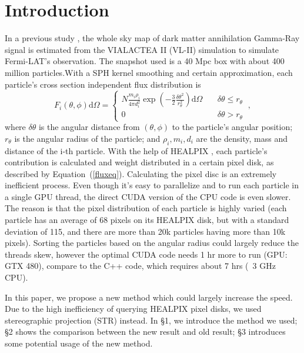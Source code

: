 \section*{Introduction}
In a previous study \citet{Kuhlen:2008kr}, the whole sky map of dark matter annihilation Gamma-Ray signal is estimated from the VIALACTEA II (VL-II) simulation to simulate Fermi-LAT's observation. The snapshot used is a 40 Mpc box with about 400 million particles.With a SPH kernel smoothing and certain approximation, each particle's cross section independent flux distribution is
\begin{equation}\label{fluxeq}
	F_i(\theta,\phi)\mathrm{d}\Omega = 
	\left\{\begin{aligned}
		N\frac{m_i\rho_i}{4\pi d_i^2} \exp\left(-\frac{3}2\frac{\delta\theta^2}{r_\theta^2}\right)\mathrm{d}\Omega  &\  & \delta\theta \le r_\theta \\
		0	&\   & \delta\theta > r_\theta\
	\end{aligned}\right. ,
\end{equation}
where $\delta\theta$ is the angular distance from $(\theta, \phi)$ to the particle's angular position; $r_\theta$ is the angular radius of the particle; and $\rho_i, m_i, d_i$ are the density, mass and distance of the i-th particle. With the help of HEALPIX \citep{Gorski:2005ku}, each particle's contribution is calculated and weight distributed in a certain pixel disk, as described by Equation~(\ref{fluxeq}). Calculating the pixel disc is an extremely inefficient process. Even though it's easy to parallelize and to run each particle in a single GPU thread, the direct CUDA version of the CPU code is even slower. The reason is that the pixel distribution of each particle is highly varied (each particle has an average of 68 pixels on its HEALPIX disk, but with a standard deviation of 115, and there are more than 20k particles having more than 10k pixels). Sorting the particles based on the angular radius could largely reduce the threads skew, however the optimal CUDA code needs 1 hr more to run (GPU: GTX 480), compare to the C++ code, which requires about 7 hrs (~3 GHz CPU). 

In this paper, we propose a new method which could largely increase the speed. Due to the high inefficiency of querying HEALPIX pixel disks, we used stereographic projection (STR) instead. In \S 1, we introduce the method we used; \S 2 shows the comparison between the new result and old result; \S 3 introduces some potential usage of the new method.


